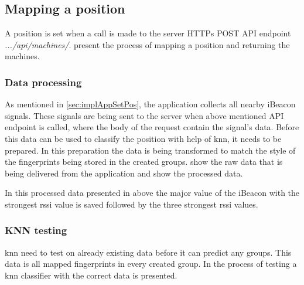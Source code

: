 \subsection{Mapping a position}\label{sec:implServerSetPos}
A position is set when a call is made to the server HTTPs POST API endpoint \textit{.../api/machines/}.
 present the process of mapping a position and returning the machines.


\subsubsection{Data processing}\label{sec:implServerSetPosDataProcessing}
As mentioned in \cref{sec:implAppSetPos}, the application collects all nearby iBeacon signals.
These signals are being sent to the server when above mentioned API endpoint is called, where the body of the request contain the signal's data.
Before this data can be used to classify the position with help of \acrfull{knn}, it needs to be prepared.
In this preparation the data is being transformed to match the style of the fingerprints being stored in the created groups.
 show the raw data that is being delivered from the application and  show the processed data.



In this processed data presented in  above the major value of the iBeacon with the strongest \acrshort{rssi} value is saved followed by the three strongest \acrshort{rssi} values.


\subsubsection{KNN testing}\label{sec:implServerSetPosKnnTesting}

\Acrshort{knn} need to test on already existing data before it can predict any groups. 
This data is all mapped fingerprints in every created group.
In  the process of testing a \acrshort{knn} classifier with the correct data is presented.

